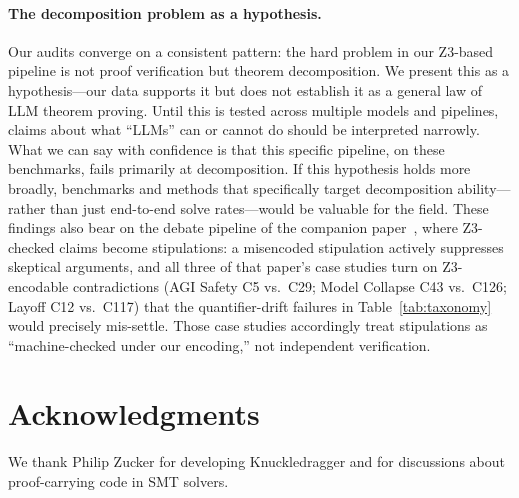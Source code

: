 \documentclass[11pt]{article}
\begin{document}
\paragraph{The decomposition problem as a hypothesis.} Our audits converge on a consistent pattern: the hard problem in our Z3-based pipeline is not proof verification but theorem decomposition. We present this as a hypothesis---our data supports it but does not establish it as a general law of LLM theorem proving. Until this is tested across multiple models and pipelines, claims about what ``LLMs'' can or cannot do should be interpreted narrowly. What we can say with confidence is that this specific pipeline, on these benchmarks, fails primarily at decomposition. If this hypothesis holds more broadly, benchmarks and methods that specifically target decomposition ability---rather than just end-to-end solve rates---would be valuable for the field. These findings also bear on the debate pipeline of the companion paper~\cite{arbiterpaperB}, where Z3-checked claims become stipulations: a misencoded stipulation actively suppresses skeptical arguments, and all three of that paper's case studies turn on Z3-encodable contradictions (AGI Safety C5 vs.\ C29; Model Collapse C43 vs.\ C126; Layoff C12 vs.\ C117) that the quantifier-drift failures in Table~\ref{tab:taxonomy} would precisely mis-settle. Those case studies accordingly treat stipulations as ``machine-checked under our encoding,'' not independent verification.

\section*{Acknowledgments}

We thank Philip Zucker for developing Knuckledragger and for discussions about proof-carrying code in SMT solvers.
\end{document}
